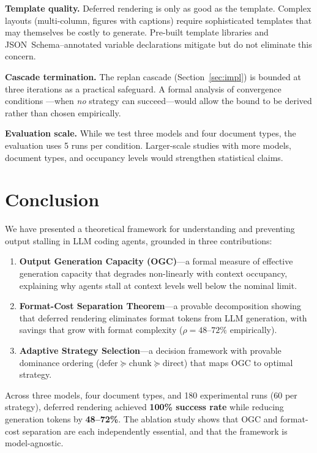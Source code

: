 \documentclass[11pt,twocolumn]{article}
\begin{document}
\textbf{Template quality.}  Deferred rendering is only as good
as the template.  Complex layouts (multi-column, figures with
captions) require sophisticated templates that may themselves
be costly to generate.  Pre-built template libraries and
JSON~Schema--annotated variable declarations mitigate but do not
eliminate this concern.

\textbf{Cascade termination.}  The replan cascade
(Section~\ref{sec:impl}) is bounded at three iterations as a
practical safeguard.  A formal analysis of convergence conditions
---when \emph{no} strategy can succeed---would allow the bound to
be derived rather than chosen empirically.

\textbf{Evaluation scale.}  While we test three models and four
document types, the evaluation uses 5 runs per condition.
Larger-scale studies with more models, document types, and
occupancy levels would strengthen statistical claims.

\section{Conclusion}
\label{sec:conclusion}

We have presented a theoretical framework for understanding and
preventing output stalling in LLM coding agents, grounded in
three contributions:

\begin{enumerate}[leftmargin=*,itemsep=2pt]
  \item \textbf{Output Generation Capacity (OGC)}---a formal
    measure of effective generation capacity that degrades
    non-linearly with context occupancy, explaining why agents
    stall at context levels well below the nominal limit.

  \item \textbf{Format-Cost Separation Theorem}---a provable
    decomposition showing that deferred rendering eliminates format
    tokens from LLM generation, with savings that grow with
    format complexity ($\rho = 48\text{--}72\%$ empirically).

  \item \textbf{Adaptive Strategy Selection}---a decision framework
    with provable dominance ordering ($\text{defer} \succeq
    \text{chunk} \succeq \text{direct}$) that maps OGC to optimal
    strategy.
\end{enumerate}

Across three models, four document types, and 180 experimental
runs (60 per strategy), deferred rendering achieved
\textbf{100\% success rate} while reducing generation tokens by
\textbf{48--72\%}.  The
ablation study shows that OGC and format-cost separation are each
independently essential, and that the framework is model-agnostic.
\end{document}
